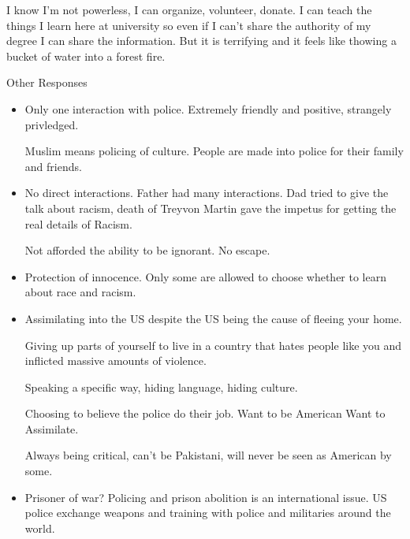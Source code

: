 \documentclass{report}
\begin{document}
\begin{description}
\begin{mdframed}
            I know I'm not powerless, I can organize, volunteer, donate. I can
            teach the things I learn here at university so even if I can't share
            the authority of my degree I can share the information. But it is terrifying
            and it feels like thowing a bucket of water into a forest fire.
        \end{mdframed}
    \item {\large Other Responses}
        \begin{itemize}
            \item Only one interaction with police. Extremely friendly and positive,
                strangely privledged.

                Muslim means policing of culture. People are made into police
                for their family and friends.

            \item
                No direct interactions. Father had many interactions.
                Dad tried to give the talk about racism, death of
                Treyvon Martin gave the impetus for getting the real
                details of Racism.

                Not afforded the ability to be ignorant. No escape.

            \item
                Protection of innocence. Only some are allowed to choose
                whether to learn about race and racism. 

            \item
                Assimilating into the US despite the US being the cause
                of fleeing your home.

                Giving up parts of yourself to live in a country that
                hates people like you and inflicted massive amounts
                of violence.

                Speaking a specific way, hiding language, hiding culture.

                Choosing to believe the police do their job. Want to be American
                Want to Assimilate.

                Always being critical, can't be Pakistani, will never be
                seen as American by some.

            \item
                Prisoner of war? Policing and prison abolition is an
                international issue. US police exchange weapons and
                training with police and militaries around the world.


\end{itemize}
\end{description}
\end{document}
